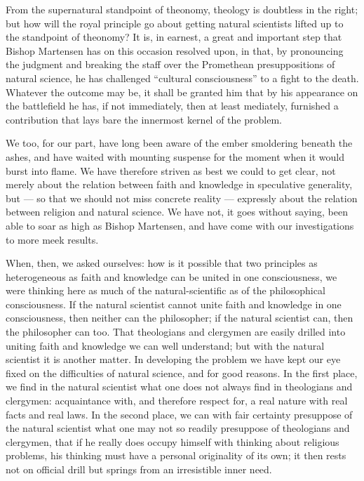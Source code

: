 \documentclass[12pt]{book}
\newcommand{\opage}[1]{\marginnote{\footnotesize\textit{[#1]}}}
\begin{document}
From the supernatural standpoint of theonomy, theology is doubtless in the right; but how will the royal principle go about getting natural scientists lifted up to the standpoint of theonomy? It is, in earnest, a great and important step that Bishop Martensen has on this occasion
\opage{24}\setcounter{footnote}{0}%
resolved upon, in that, by pronouncing the judgment and breaking the staff over the Promethean presuppositions of natural science, he has challenged ``cultural consciousness'' to a fight to the death. Whatever the outcome may be, it shall be granted him that by his appearance on the battlefield he has, if not immediately, then at least mediately, furnished a contribution that lays bare the innermost kernel of the problem.

We too, for our part, have long been aware of the ember smoldering beneath the ashes, and have waited with mounting suspense for the moment when it would burst into flame. We have therefore striven as best we could to get clear, not merely about the relation between faith and knowledge in speculative generality, but --- so that we should not miss concrete reality --- expressly about the relation between religion and natural science. We have not, it goes without saying, been able to soar as high as Bishop Martensen, and have come with our investigations to more meek results.

When, then, we asked ourselves: how is it possible that two principles as heterogeneous as faith and knowledge can be united in one consciousness, we were thinking here as much of the natural-scientific as of the philosophical consciousness. If the natural scientist cannot unite faith and knowledge in one consciousness, then neither can the philosopher; if the natural scientist can, then the philosopher can too. That theologians and clergymen are easily drilled into uniting faith and knowledge we can well understand; but with the natural scientist it is another matter. In developing the problem we have kept our eye fixed on the difficulties of natural science, and for good reasons. In the first place, we find in the natural scientist what one does not always find in theologians and clergymen: acquaintance with, and therefore respect for, a real nature with real facts and real laws. In the second place, we can with fair certainty presuppose of the natural scientist what one may not so readily presuppose of theologians and
\opage{25}\setcounter{footnote}{0}%
clergymen, that if he really does occupy himself with thinking about religious problems, his thinking must have a personal originality of its own; it then rests not on official drill but springs from an irresistible inner need.
\end{document}
